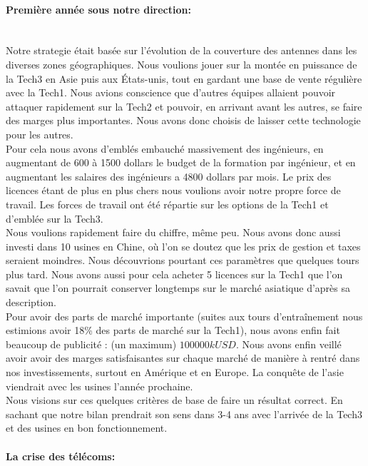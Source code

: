 \paragraph{Première année sous notre direction:}~\\
Notre strategie était basée sur l'évolution de la couverture des
antennes dans les diverses zones géographiques. Nous voulions jouer
sur la montée en puissance de la Tech3 en Asie puis aux États-unis,
tout en gardant une base de vente régulière avec la Tech1. Nous
avions conscience que d'autres équipes allaient pouvoir attaquer 
rapidement sur la Tech2 et pouvoir, en arrivant avant les autres,
se faire des marges plus importantes. Nous avons donc choisis de 
laisser cette technologie pour les autres.\\

Pour cela nous avons d'emblés embauché massivement des ingénieurs, 
en augmentant de 600 à 1500 dollars le budget de la formation par 
ingénieur, et en augmentant les salaires des ingénieurs a 4800
dollars par mois. Le prix des licences étant de plus en plus chers
nous voulions avoir notre propre force de travail.
Les forces de travail ont été répartie sur les options de la Tech1
et d'emblée sur la Tech3.\\

Nous voulions rapidement faire du chiffre, même peu. Nous avons donc 
aussi investi dans 10 usines en Chine, où l'on se doutez que les prix 
de gestion et taxes seraient moindres. Nous découvrions pourtant
ces paramètres que quelques tours plus tard. Nous avons aussi pour cela
acheter 5 licences sur la Tech1 que l'on savait que l'on pourrait 
conserver longtemps sur le marché asiatique d'après sa description.\\
 
Pour avoir des parts de marché importante (suites aux tours d'entraînement
nous estimions avoir 18\% des parts de marché sur la Tech1), nous
avons enfin fait beaucoup de publicité : (un maximum) $100 000 kUSD$.
Nous avons enfin veillé avoir avoir des marges satisfaisantes sur chaque
marché de manière à rentré dans nos investissements, surtout en Amérique
et en Europe. La conquête de l'asie viendrait avec les usines l'année 
prochaine.\\

Nous visions sur ces quelques critères de base de faire un résultat
correct. En sachant que notre bilan prendrait son sens dans 3-4 ans
avec l'arrivée de la Tech3 et des usines en bon fonctionnement.


\paragraph{La crise des télécoms:}~\\

